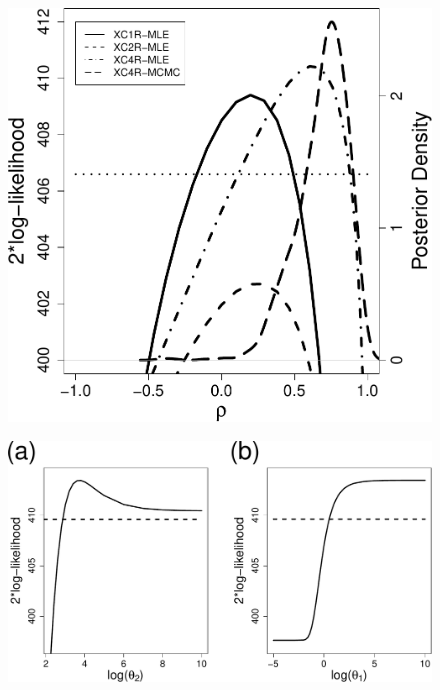 \documentclass[11pt, titlepage]{article}\usepackage[]{graphicx}\usepackage[]{color}
\begin{document}
\begin{spacing}{1.9}
\begin{flushleft}
\begin{figure}[H]
  \begin{center}
  \includegraphics[width=\linewidth]{Fig-rhoProfile.pdf}
  \end{center}
  \caption{ \label{Fig-rhoProfile}}     
\end{figure}



\begin{figure}[H]
  \begin{center}
  \includegraphics[width=\linewidth]{Fig-thetaProfiles.pdf}
  \end{center}
  \caption{ \label{Fig-thetaProfiles}}     
\end{figure}



\end{flushleft}
\end{spacing}
\end{document}

